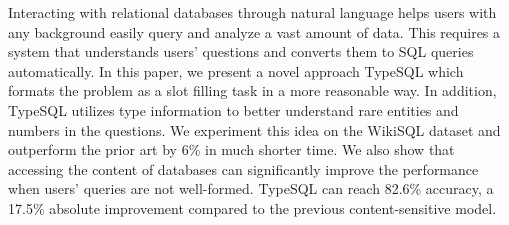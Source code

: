 Interacting with relational databases through natural language helps users with any background easily query and analyze a vast amount of data. This requires a system that understands users' questions and converts them to SQL queries automatically. In this paper, we present a novel approach TypeSQL which formats the problem as a slot filling task in a more reasonable way. In addition, TypeSQL utilizes type information to better understand rare entities and numbers in the questions. We experiment this idea on the WikiSQL dataset and outperform the prior art by 6\% in much shorter time. We also show that accessing the content of databases can significantly improve the performance when users' queries are not well-formed. TypeSQL can reach 82.6\% accuracy, a 17.5\% absolute improvement compared to the previous content-sensitive model.
